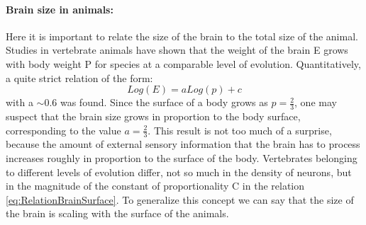 \paragraph{Brain size in animals:}
 Here it is important to relate the size of the brain to the total size of the animal. Studies in vertebrate animals have shown that the weight of the brain E grows with body weight P for species at a comparable level of evolution. Quantitatively, a quite strict relation of the form:
\begin{equation}
    Log(E)=a Log(p)+c
    \label{eq:RelationBrainSurface}
\end{equation}
with a $\sim 0.6$ was found. Since the surface of a body grows as $p=\frac{2}{3}$, one may suspect that the brain size grows in proportion to the body
surface, corresponding to the value $a = \frac{2}{3}$. This result is not too much of a
surprise, because the amount of external sensory information that the brain
has to process increases roughly in proportion to the surface of the body.
Vertebrates belonging to different levels of evolution differ, not so much in
the density of neurons, but in the magnitude of the constant of proportionality
C in the relation \ref{eq:RelationBrainSurface}.
To generalize this concept we can say that the size of the brain is scaling with the surface of the animals.


